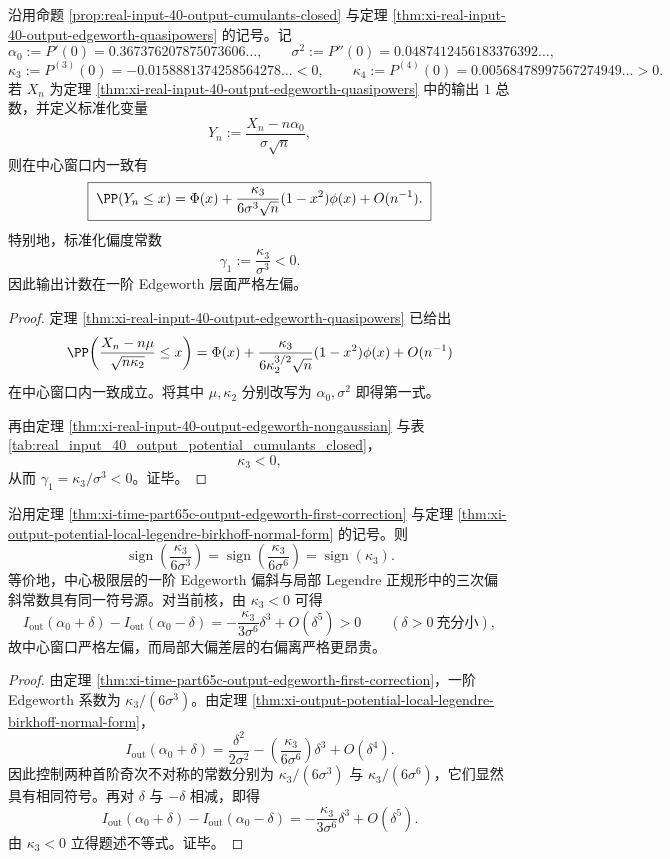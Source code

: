 \begin{theorem}\label{thm:xi-time-part65c-output-edgeworth-first-correction}
沿用命题 \ref{prop:real-input-40-output-cumulants-closed} 与定理 \ref{thm:xi-real-input-40-output-edgeworth-quasipowers} 的记号。记
\[
\alpha_0:=P'(0)=0.367376207875073606\ldots,
\qquad
\sigma^2:=P''(0)=0.0487412456183376392\ldots,
\]
\[
\kappa_3:=P^{(3)}(0)=-0.0158881374258564278\ldots<0,
\qquad
\kappa_4:=P^{(4)}(0)=0.00568478997567274949\ldots>0.
\]
若 \(X_n\) 为定理 \ref{thm:xi-real-input-40-output-edgeworth-quasipowers} 中的输出 \(1\) 总数，并定义标准化变量
\[
Y_n:=\frac{X_n-n\alpha_0}{\sigma\sqrt n},
\]
则在中心窗口内一致有
\[
\boxed{\;
\PP(Y_n\le x)
=
\Phi(x)
+\frac{\kappa_3}{6\sigma^3\sqrt n}(1-x^2)\phi(x)
+O(n^{-1}).\;}
\]
特别地，标准化偏度常数
\[
\boxed{\;
\gamma_1:=\frac{\kappa_3}{\sigma^3}<0.\;}
\]
因此输出计数在一阶 Edgeworth 层面严格左偏。
\end{theorem}
\begin{proof}
定理 \ref{thm:xi-real-input-40-output-edgeworth-quasipowers} 已给出
\[
\PP\!\left(
\frac{X_n-n\mu}{\sqrt{n\kappa_2}}
\le x
\right)
=
\Phi(x)
+\frac{\kappa_3}{6\kappa_2^{3/2}\sqrt n}(1-x^2)\phi(x)
+O(n^{-1})
\]
在中心窗口内一致成立。将其中 \(\mu,\kappa_2\) 分别改写为 \(\alpha_0,\sigma^2\) 即得第一式。

再由定理 \ref{thm:xi-real-input-40-output-edgeworth-nongaussian} 与表 \ref{tab:real_input_40_output_potential_cumulants_closed}，
\[
\kappa_3<0,
\]
从而 \(\gamma_1=\kappa_3/\sigma^3<0\)。证毕。
\end{proof}

\begin{corollary}\label{cor:xi-time-part65c-edgeworth-local-ldp-sign-lock}
沿用定理 \ref{thm:xi-time-part65c-output-edgeworth-first-correction} 与定理 \ref{thm:xi-output-potential-local-legendre-birkhoff-normal-form} 的记号。则
\[
\operatorname{sign}\!\left(\frac{\kappa_3}{6\sigma^3}\right)
=
\operatorname{sign}\!\left(\frac{\kappa_3}{6\sigma^6}\right)
=
\operatorname{sign}(\kappa_3).
\]
等价地，中心极限层的一阶 Edgeworth 偏斜与局部 Legendre 正规形中的三次偏斜常数具有同一符号源。对当前核，由 \(\kappa_3<0\) 可得
\[
I_{\mathrm{out}}(\alpha_0+\delta)-I_{\mathrm{out}}(\alpha_0-\delta)
=
-\frac{\kappa_3}{3\sigma^6}\delta^3+O(\delta^5)>0
\qquad (\delta>0\ \text{充分小}),
\]
故中心窗口严格左偏，而局部大偏差层的右偏离严格更昂贵。
\end{corollary}
\begin{proof}
由定理 \ref{thm:xi-time-part65c-output-edgeworth-first-correction}，一阶 Edgeworth 系数为 \(\kappa_3/(6\sigma^3)\)。由定理 \ref{thm:xi-output-potential-local-legendre-birkhoff-normal-form}，
\[
I_{\mathrm{out}}(\alpha_0+\delta)
=
\frac{\delta^2}{2\sigma^2}
-
\left(\frac{\kappa_3}{6\sigma^6}\right)\delta^3
+O(\delta^4).
\]
因此控制两种首阶奇次不对称的常数分别为 \(\kappa_3/(6\sigma^3)\) 与 \(\kappa_3/(6\sigma^6)\)，它们显然具有相同符号。再对 \(\delta\) 与 \(-\delta\) 相减，即得
\[
I_{\mathrm{out}}(\alpha_0+\delta)-I_{\mathrm{out}}(\alpha_0-\delta)
=
-\frac{\kappa_3}{3\sigma^6}\delta^3+O(\delta^5).
\]
由 \(\kappa_3<0\) 立得题述不等式。证毕。
\end{proof}

